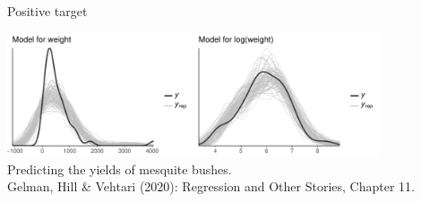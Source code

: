 \documentclass[t]{beamer}
\begin{document}
\begin{frame}{Positive target}
  
    \includegraphics[width=11cm]{mesquite_ppc.pdf}\\
  \vspace{-0.1\baselineskip} {Predicting the yields of mesquite bushes.\\
    \color{gray} \footnotesize
    Gelman, Hill \& Vehtari (2020): Regression and Other Stories, Chapter 11.}\\

\end{frame}
\end{document}
